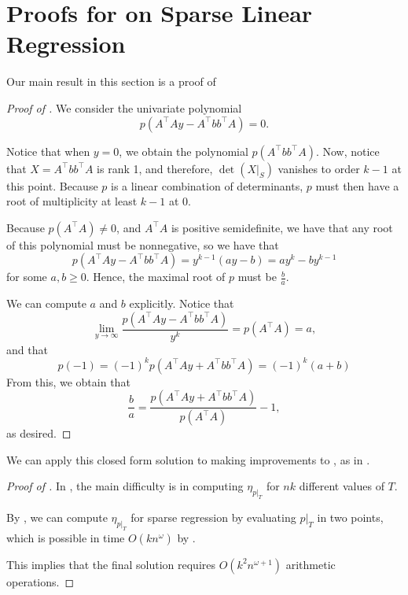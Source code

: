 \documentclass{amsart}
\theoremstyle{definition}
\begin{document}
\section{Proofs for  on Sparse Linear Regression}
Our main result in this section is a proof of 
\begin{proof}[Proof of ]
    We consider the univariate polynomial
    \[p(A^{\intercal}A y - A^{\intercal}bb^{\intercal}A) = 0.\]

    Notice that when $y = 0$, we obtain the polynomial $p(A^{\intercal}bb^{\intercal}A)$. Now, notice that $X = A^{\intercal}bb^{\intercal}A$ is rank 1, and therefore, $\det(X|_S)$ vanishes to order $k-1$ at this point.
    Because $p$ is a linear combination of determinants, $p$ must then have a root of multiplicity at least $k-1$ at 0.

    Because $p(A^{\intercal}A) \neq 0$, and $A^{\intercal}A$ is positive semidefinite, we have that any root of this polynomial must be nonnegative, so we have that
    \[
        p(A^{\intercal}A y - A^{\intercal}bb^{\intercal}A) = y^{k-1}(ay - b) = ay^k-by^{k-1}
    \]
    for some $a,b\ge 0$. Hence, the maximal root of $p$ must be $\frac{b}{a}$.

    We can compute $a$ and $b$ explicitly. Notice that
    \[
        \lim_{y \rightarrow \infty} \frac{p(A^{\intercal}A y - A^{\intercal}bb^{\intercal}A)}{y^k} = p(A^{\intercal}A) = a,
    \]
    and that
    \[
        p(-1) = (-1)^kp(A^{\intercal}A y + A^{\intercal}bb^{\intercal}A) = (-1)^k(a+b)
    \]
    From this, we obtain that
    \[
        \frac{b}{a} = \frac{p(A^{\intercal}A y + A^{\intercal}bb^{\intercal}A)}{p(A^{\intercal}A)} - 1,
    \]
    as desired.
\end{proof}

We can apply this closed form solution to making improvements to , as in .
\begin{proof}[Proof of ]
    In , the main difficulty is in computing $\eta_{p|_T}$ for $nk$ different values of $T$.

    By , we can compute $\eta_{p|_T}$ for sparse regression by evaluating $p|_T$ in two points, which is possible in time $O(kn^{\omega})$ by .

    This implies that the final solution requires $O(k^2n^{\omega+1})$ arithmetic operations.
\end{proof}
\end{document}
